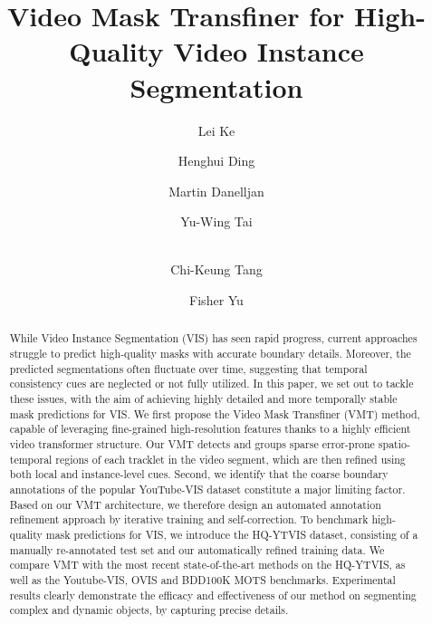 \documentclass[runningheads]{llncs}
\begin{document}
\pagestyle{headings}
\mainmatter
\def\ECCVSubNumber{939}  

\title{Video Mask Transfiner for High-Quality Video Instance Segmentation}

\begin{comment}
\titlerunning{ECCV-22 submission ID \ECCVSubNumber} 
\authorrunning{ECCV-22 submission ID \ECCVSubNumber} 
\author{Anonymous ECCV submission}
\institute{Paper ID \ECCVSubNumber}
\end{comment}




\author{
 Lei Ke \and Henghui Ding \and Martin Danelljan \and Yu-Wing Tai \and \\ Chi-Keung Tang \and Fisher Yu\\
 }



\maketitle

\begin{abstract}
While Video Instance Segmentation (VIS) has seen rapid progress, current approaches struggle to predict high-quality masks with accurate boundary details. Moreover, the predicted segmentations often fluctuate over time, suggesting that temporal consistency cues are neglected or not fully utilized. In this paper, we set out to tackle these issues, with the aim of achieving highly detailed and more temporally stable mask predictions for VIS. We first propose the Video Mask Transfiner (VMT) method, capable of leveraging fine-grained high-resolution features thanks to a highly efficient video transformer structure. Our VMT detects and groups sparse error-prone spatio-temporal regions of each tracklet in the video segment, which are then refined using both local and instance-level cues. Second, we identify that the coarse boundary annotations of the popular YouTube-VIS dataset constitute a major limiting factor. Based on our VMT architecture, we therefore design an automated annotation refinement approach by iterative training and self-correction. To benchmark high-quality mask predictions for VIS, we introduce the HQ-YTVIS dataset, consisting of a manually re-annotated test set and our automatically refined training data. We compare VMT with the most recent state-of-the-art methods on the HQ-YTVIS, as well as the Youtube-VIS, OVIS and BDD100K MOTS benchmarks. Experimental results clearly demonstrate the efficacy and effectiveness of our method on segmenting complex and dynamic objects, by capturing precise details.

\end{abstract}
\end{document}

